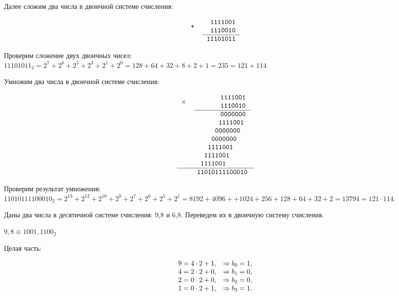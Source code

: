\documentclass[a4paper,14pt]{extarticle}
\begin{document}
  Далее сложим два числа в двоичной системе счисления:

  \[
  \begin{tabular}{{c}{c}}
    \texttt{+} &
    \begin{tabular}{c}
      \texttt{~1111001}\\
      \texttt{~1110010}\\
      \hline
    \end{tabular}\\
    & \texttt{11101011}
  \end{tabular}
  \]

  Проверим сложение двух двоичных чисел:\\
  $11101011_2=2^{7}+2^{6}+2^{5}+2^{3}+2^{1}+2^{0}=128+64+32+8+2+1=235=121+114$

  Умножим два числа в двоичной системе счисления:

  \[
  \begin{tabular}{{c}{c}}
    \texttt{$\times$}&
    \begin{tabular}{c}
      \texttt{~~~~~~1111001}\\
      \texttt{~~~~~~1110010}\\
      \hline
    \end{tabular}\\
    & \texttt{~~~~~~0000000}\\
    & \texttt{~~~~~1111001~}\\
    & \texttt{~~~~0000000~~}\\
    & \texttt{~~~0000000~~~}\\
    & \texttt{~~1111001~~~~}\\
    & \texttt{~1111001~~~~~}\\
    & \texttt{1111001~~~~~~}\\
    \hline
    & \texttt{11010111100010}
  \end{tabular}
  \]

  Проверим результат умножения:\\
  $11010111100010_{2}=2^{13}+2^{12}+2^{10}+2^{8}+2^{7}+2^{6}+2^{5}+2^{1}=8192+4096++1024+256+128+64+32+2=13794=121 \cdot 114$.

  Даны два числа в десятичной системе счисления: 9,8 и 6,8. Переведем их в двоичную систему счисления.

  $9,8 \equiv 1001,1100_{2}$

  Целая часть:

  \[
  \begin{array}[c]{ll}
    9 = 4 \cdot 2 + 1, &\Rightarrow b_{0} = 1,\\
    4 = 2 \cdot 2 + 0, &\Rightarrow b_{1} = 0,\\
    2 = 0 \cdot 2 + 0, &\Rightarrow b_{2} = 0,\\
    1 = 0 \cdot 2 + 1, &\Rightarrow b_{3} = 1.
  \end{array}
  \]
\end{document}
